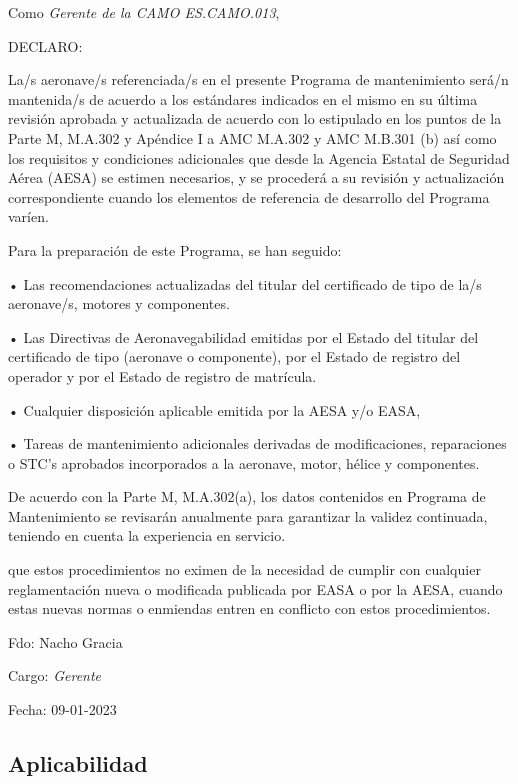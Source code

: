 \documentclass[
]{article}
\begin{document}
Como \emph{Gerente de la CAMO ES.CAMO.013},

DECLARO:

La/s aeronave/s referenciada/s en el presente Programa de mantenimiento
será/n mantenida/s de acuerdo a los estándares indicados en el mismo en
su última revisión aprobada y actualizada de acuerdo con lo estipulado
en los puntos de la Parte M, M.A.302 y Apéndice I a AMC M.A.302 y AMC
M.B.301 (b) así como los requisitos y condiciones adicionales que desde
la Agencia Estatal de Seguridad Aérea (AESA) se estimen necesarios, y se
procederá a su revisión y actualización correspondiente cuando los
elementos de referencia de desarrollo del Programa varíen.

Para la preparación de este Programa, se han seguido:

• Las recomendaciones actualizadas del titular del certificado de tipo
de la/s aeronave/s, motores y componentes.

• Las Directivas de Aeronavegabilidad emitidas por el Estado del titular
del certificado de tipo (aeronave o componente), por el Estado de
registro del operador y por el Estado de registro de matrícula.

• Cualquier disposición aplicable emitida por la AESA y/o EASA,

• Tareas de mantenimiento adicionales derivadas de modificaciones,
reparaciones o STC's aprobados incorporados a la aeronave, motor, hélice
y componentes.

De acuerdo con la Parte M, M.A.302(a), los datos contenidos en Programa
de Mantenimiento se revisarán anualmente para garantizar la validez
continuada, teniendo en cuenta la experiencia en servicio.

que estos procedimientos no eximen de la necesidad de cumplir con
cualquier reglamentación nueva o modificada publicada por EASA o por la
AESA, cuando estas nuevas normas o enmiendas entren en conflicto con
estos procedimientos.

Fdo: Nacho Gracia

Cargo: \emph{Gerente}

Fecha: 09-01-2023

\hypertarget{section-1}{%
\subsection*{}\label{section-1}}

\hypertarget{aplicabilidad}{%
\subsection{Aplicabilidad}\label{aplicabilidad}}
\end{document}
